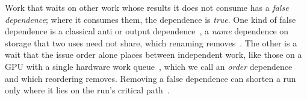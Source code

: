 Work that waits on other work whose results it does not consume has a \emph{false dependence}; where it consumes them, the dependence is \emph{true}.
One kind of false dependence is a classical anti or output dependence~\citep{kuck1981dependence}, a \emph{name} dependence on storage that two uses need not share, which renaming removes~\citep{tomasulo1967}.
The other is a wait that the issue order alone places between independent work, like those on a GPU with a single hardware work queue~\citep{nvidia-kepler-gk110}, which we call an \emph{order} dependence and which reordering removes.
Removing a false dependence can shorten a run only where it lies on the run's critical path~\citep{kelley1961critical}.
